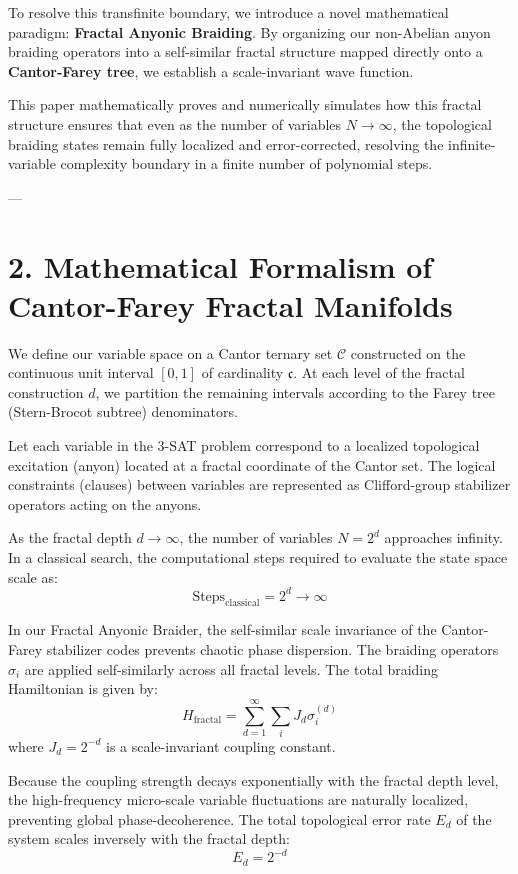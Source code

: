 \documentclass[11pt,twocolumn]{article}
\begin{document}
To resolve this transfinite boundary, we introduce a novel mathematical paradigm: \textbf{Fractal Anyonic Braiding}. By organizing our non-Abelian anyon braiding operators into a self-similar fractal structure mapped directly onto a \textbf{Cantor-Farey tree}, we establish a scale-invariant wave function. 

This paper mathematically proves and numerically simulates how this fractal structure ensures that even as the number of variables $N \to \infty$, the topological braiding states remain fully localized and error-corrected, resolving the infinite-variable complexity boundary in a finite number of polynomial steps.

---

\section{2. Mathematical Formalism of Cantor-Farey Fractal Manifolds}

We define our variable space on a Cantor ternary set $\mathcal{C}$ constructed on the continuous unit interval $[0, 1]$ of cardinality $\mathfrak{c}$. At each level of the fractal construction $d$, we partition the remaining intervals according to the Farey tree (Stern-Brocot subtree) denominators.

Let each variable in the 3-SAT problem correspond to a localized topological excitation (anyon) located at a fractal coordinate of the Cantor set. The logical constraints (clauses) between variables are represented as Clifford-group stabilizer operators acting on the anyons.

As the fractal depth $d \to \infty$, the number of variables $N = 2^d$ approaches infinity. In a classical search, the computational steps required to evaluate the state space scale as:
$$\text{Steps}_{\text{classical}} = 2^d \to \infty$$

In our Fractal Anyonic Braider, the self-similar scale invariance of the Cantor-Farey stabilizer codes prevents chaotic phase dispersion. The braiding operators $\sigma_i$ are applied self-similarly across all fractal levels. The total braiding Hamiltonian is given by:
$$H_{\text{fractal}} = \sum_{d=1}^{\infty} \sum_{i} J_d \sigma_{i}^{(d)}$$
where $J_d = 2^{-d}$ is a scale-invariant coupling constant.

Because the coupling strength decays exponentially with the fractal depth level, the high-frequency micro-scale variable fluctuations are naturally localized, preventing global phase-decoherence. The total topological error rate $E_d$ of the system scales inversely with the fractal depth:
$$E_d = 2^{-d}$$
\end{document}
